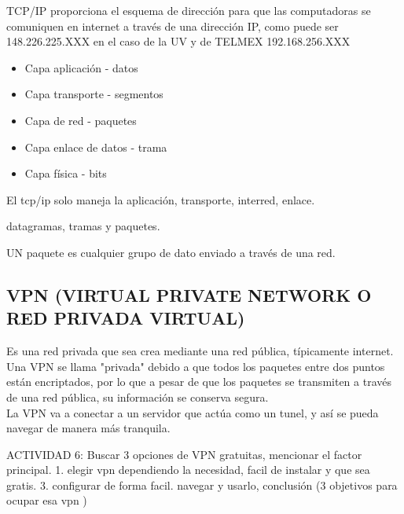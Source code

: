 \documentclass[letterpaper,12pt]{article}
\begin{document}
\begin{sloppypar}
TCP/IP proporciona el esquema de dirección para que las computadoras se comuniquen en internet a través de una dirección IP, como puede ser 148.226.225.XXX en el caso de la UV y de TELMEX 192.168.256.XXX

\begin{itemize}
    \item Capa aplicación - datos
    \item Capa transporte - segmentos
    \item Capa de red - paquetes
    \item Capa enlace de datos - trama
    \item Capa física - bits 
\end{itemize}

El tcp/ip solo maneja la aplicación, transporte, interred, enlace.  

datagramas, tramas y paquetes.

UN paquete es cualquier grupo de dato enviado a través de una red.

\subsection{VPN (VIRTUAL PRIVATE NETWORK O RED PRIVADA VIRTUAL)}
Es una red privada que sea crea mediante una red pública, típicamente internet.
\vspace{0.3cm}\\ 
Una VPN se llama "privada" debido a que todos los paquetes entre dos puntos están encriptados, por lo que a pesar de que los paquetes se transmiten a través de una red pública, su información se conserva segura.
\vspace{0.3cm}\\ 
La VPN va a conectar a un servidor que actúa como un tunel, y así se pueda navegar de manera más tranquila.

ACTIVIDAD 6: Buscar 3 opciones de VPN gratuitas, mencionar el factor principal. 1. elegir vpn dependiendo la necesidad, facil de instalar y que sea gratis. 3. configurar de forma facil. navegar y usarlo, conclusión (3 objetivos para ocupar esa vpn )

\end{sloppypar}
\end{document}
